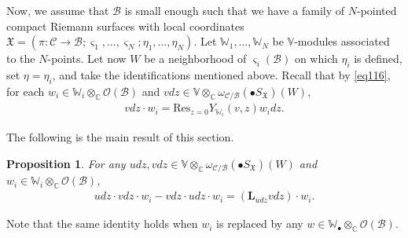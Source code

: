 \documentclass[12pt,b5paper,notitlepage]{report}
\theoremstyle{definition}
\theoremstyle{plain}
\newtheorem{pp}[df]{Proposition}
\newcommand{\fk}{\mathfrak}
\newcommand{\mc}{\mathcal}
\newcommand{\Res}{\mathrm{Res}}
\newcommand{\scr}{\mathscr}
\newcommand{\sgm}{\varsigma}
\newcommand{\mbf}{\mathbf}
\newcommand{\blt}{\bullet}
\newcommand{\Vbb}{\mathbb V}
\newcommand{\Wbb}{\mathbb W}
\newcommand{\Cbb}{\mathbb C}
\numberwithin{equation}{section}
\begin{document}
Now, we assume that $\mc B$ is small enough such that we have a family of $N$-pointed compact Riemann surfaces with local coordinates $\fk X=(\pi:\mc C\rightarrow\mc B;\sgm_1,\dots,\sgm_N;\eta_1,\dots,\eta_N)$. Let $\Wbb_1,\dots,\Wbb_N$ be $\Vbb$-modules associated to the $N$-points. Let now $W$ be a neighborhood of $\sgm_i(\mc B)$ on which $\eta_i$ is defined,  set $\eta=\eta_i$, and take the identifications mentioned above. Recall that by \eqref{eq116}, for each $w_i\in\Wbb_i\otimes_\Cbb\scr O(\mc B)$ and $vdz\in\Vbb\otimes_\Cbb\omega_{\mc C/\mc B}(\blt S_{\fk X})(W)$,
\begin{align*}
vdz\cdot w_i=\Res_{z=0}Y_{\Wbb_i}(v,z)w_idz.
\end{align*}


The following is the main result of this section.

\begin{pp}\label{lb51}
For any $udz,vdz\in\Vbb\otimes_\Cbb\omega_{\mc C/\mc B}(\blt S_{\fk X})(W)$ and $w_i\in\Wbb_i\otimes_\Cbb\scr O(\mc B)$,
\begin{align*}
udz\cdot vdz\cdot w_i-vdz\cdot udz\cdot w_i=(\mbf L_{udz}vdz)\cdot w_i.
\end{align*}
\end{pp}
Note that the same identity holds when $w_i$ is replaced by any $w\in\Wbb_\blt\otimes_\Cbb\scr O(\mc B)$.
\end{document}
